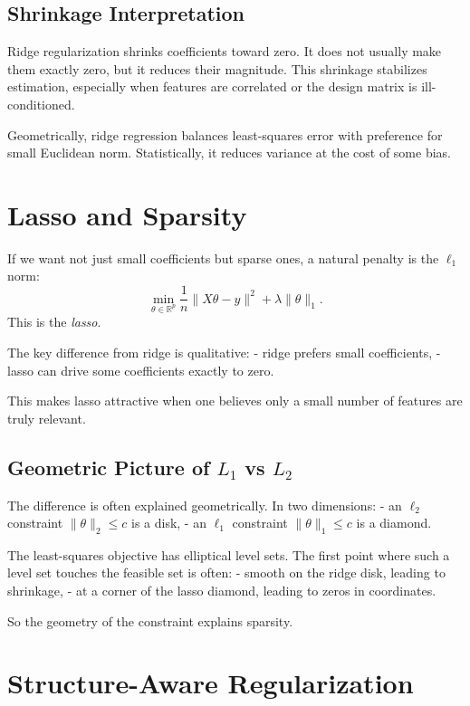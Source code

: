 \subsection{Shrinkage Interpretation}

Ridge regularization shrinks coefficients toward zero. It does not usually make them exactly zero, but it reduces their magnitude. This shrinkage stabilizes estimation, especially when features are correlated or the design matrix is ill-conditioned.

Geometrically, ridge regression balances least-squares error with preference for small Euclidean norm. Statistically, it reduces variance at the cost of some bias.

\section{Lasso and Sparsity}

If we want not just small coefficients but sparse ones, a natural penalty is the $\ell_1$ norm:
\[
\min_{\theta\in\mathbb R^p}
\frac1n\|X\theta-y\|^2+\lambda \|\theta\|_1.
\]
This is the \emph{lasso}.

The key difference from ridge is qualitative:
- ridge prefers small coefficients,
- lasso can drive some coefficients exactly to zero.

This makes lasso attractive when one believes only a small number of features are truly relevant.

\subsection{Geometric Picture of \texorpdfstring{$L_1$}{L1} vs \texorpdfstring{$L_2$}{L2}}

The difference is often explained geometrically. In two dimensions:
- an $\ell_2$ constraint $\|\theta\|_2\le c$ is a disk,
- an $\ell_1$ constraint $\|\theta\|_1\le c$ is a diamond.

The least-squares objective has elliptical level sets. The first point where such a level set touches the feasible set is often:
- smooth on the ridge disk, leading to shrinkage,
- at a corner of the lasso diamond, leading to zeros in coordinates.

So the geometry of the constraint explains sparsity.

\section{Structure-Aware Regularization}

